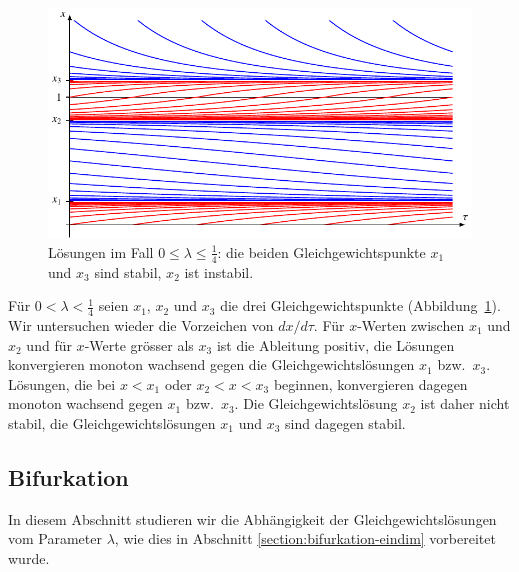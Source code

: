 \begin{figure}
\centering
\includegraphics{chapters/4/drei.pdf}
\caption{Lösungen im Fall $0\le \lambda\le\frac14$: die beiden
Gleichgewichtspunkte $x_1$ und $x_3$ sind stabil, $x_2$ ist instabil.
\label{skript:thc:drei}}
\end{figure}%
Für $0<\lambda<\frac14$ seien
$x_1$, $x_2$ und $x_3$ die drei Gleichgewichtspunkte
(Abbildung~\ref{skript:thc:drei}).
Wir untersuchen wieder die Vorzeichen von $dx/d\tau$. 
Für $x$-Werten zwischen $x_1$ und $x_2$ und für $x$-Werte grösser
als $x_3$ ist die Ableitung positiv, die Lösungen konvergieren monoton
wachsend gegen die Gleichgewichtslösungen $x_1$ bzw.~$x_3$.
Lösungen, die bei $x<x_1$ oder $x_2<x<x_3$ beginnen, konvergieren
dagegen monoton wachsend gegen $x_1$ bzw.~$x_3$.
Die Gleichgewichtslösung $x_2$ ist daher nicht stabil,
die Gleichgewichtslösungen $x_1$ und $x_3$ sind dagegen stabil.

\subsection{Bifurkation}
In diesem Abschnitt studieren wir die Abhängigkeit der Gleichgewichtslösungen
vom Parameter $\lambda$, wie dies in Abschnitt
\ref{section:bifurkation-eindim} vorbereitet wurde.

